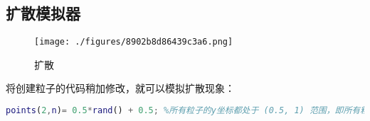 \subsection{扩散模拟器}
\begin{figure}[ht]
\centering
\texttt{[image: ./figures/8902b8d86439c3a6.png]}
\caption{扩散} \label{fig_DIFMIX_2}
\end{figure}
将创建粒子的代码稍加修改，就可以模拟扩散现象：
\begin{lstlisting}[language=matlab]
points(2,n)= 0.5*rand() + 0.5; %所有粒子的y坐标都处于 (0.5, 1) 范围，即所有粒子初始时仅分布在上半容器。
\end{lstlisting}
